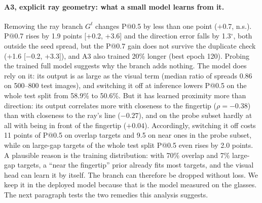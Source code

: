 \paragraph{A3, explicit ray geometry: what a small model learns from it.} Removing the ray branch $G^t$ changes P@0.5 by less than one point ($+$0.7, n.s.). P@0.7 rises by 1.9 points [+0.2, +3.6] and the direction error falls by 1.3$^\circ$, both outside the seed spread, but the P@0.7 gain does not survive the duplicate check ($+$1.6 [$-$0.2, +3.3]), and A3 also trained 20\% longer (best epoch 120). Probing the trained full model suggests why the branch adds nothing. The model does rely on it: its output is as large as the visual term (median ratio of spreads 0.86 on 500--800 test images), and switching it off at inference lowers P@0.5 on the whole test split from 58.9\% to 50.6\%. But it has learned proximity more than direction: its output correlates more with closeness to the fingertip ($\rho=-0.38$) than with closeness to the ray's line ($-0.27$), and on the probe subset hardly at all with being in front of the fingertip ($+0.04$). Accordingly, switching it off costs 11 points of P@0.5 on overlap targets and 9.5 on near ones in the probe subset, while on large-gap targets of the whole test split P@0.5 even rises by 2.0 points. A plausible reason is the training distribution: with 70\% overlap and 7\% large-gap targets, a ``near the fingertip'' prior already fits most targets, and the visual head can learn it by itself. The branch can therefore be dropped without loss. We keep it in the deployed model because that is the model measured on the glasses. The next paragraph tests the two remedies this analysis suggests.


